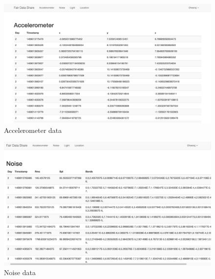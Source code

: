 
\begin{figure}[ht!]
\centering
\includegraphics[width=\textwidth,keepaspectratio]{./images/fds_user_acc_full}
\caption{Accelerometer data\label{fig:fdsacc}}
\end{figure}

\begin{figure}[ht!]
\centering
\includegraphics[width=\textwidth,keepaspectratio]{./images/fds_user_noise_full}
\caption{Noise data \label{fig:fdsnoise}}
\end{figure}

